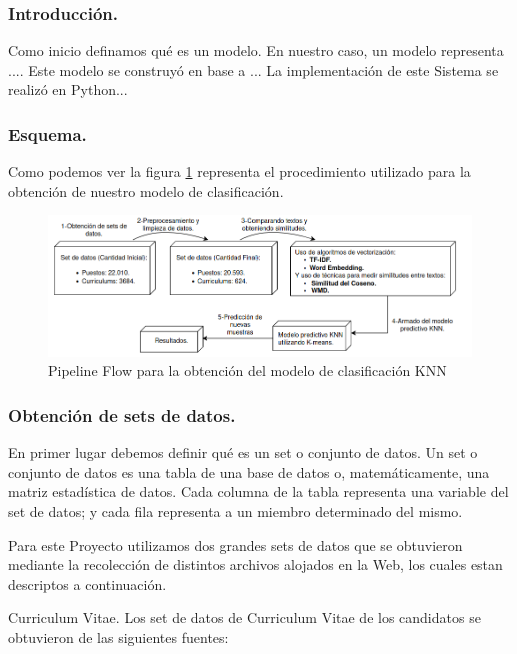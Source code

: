 \documentclass[12pt,a4paper]{article}
\makeatletter
\renewcommand\paragraph{\@startsection{paragraph}{4}{\z@}
            {-2.5ex\@plus -1ex \@minus -.25ex}
            {1.25ex \@plus .25ex}
            {\normalfont\normalsize\bfseries}}
\makeatother
\begin{document}
\begin{sloppypar}
\subsubsection{Introducción.}
Como inicio definamos qué es un modelo. En nuestro caso, un modelo representa ....
Este modelo se construyó en base a ...
La implementación de este Sistema se realizó en Python...

\subsubsection{Esquema.}
Como podemos ver la figura \ref{fig:FlowCoreSystem} representa el procedimiento utilizado para la obtención de nuestro modelo de clasificación. 

\begin{figure}[H]    %
  \centering
  \includegraphics[width=1\textwidth]{images/flow-core.png} 	%
  \caption{Pipeline Flow para la obtención del modelo de clasificación KNN}  
  \label{fig:FlowCoreSystem}
\end{figure}

\cleardoublepage

\subsubsection{Obtención de sets de datos.}\label{obtencion_set_datos}
En primer lugar debemos definir qué es un set o conjunto de datos.
Un set o conjunto de datos es una tabla de una base de datos o, matemáticamente, una matriz estadística de datos. Cada columna de la tabla representa una variable del set de datos; y cada fila representa a un miembro determinado del mismo.

Para este Proyecto utilizamos dos grandes sets de datos que se obtuvieron mediante la recolección de distintos archivos alojados en la Web, los cuales estan descriptos a continuación.

\paragraph{Curriculum Vitae.}
Los set de datos de Curriculum Vitae de los candidatos se obtuvieron de las siguientes fuentes:


\end{sloppypar}
\end{document}
